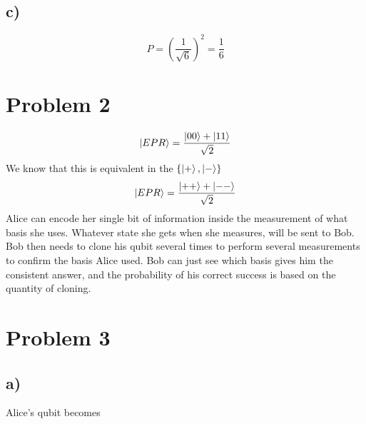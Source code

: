 \documentclass[]{article}
\begin{document}
\hypertarget{c}{%
\subsection{c)}\label{c}}

\[
P = \left( \frac{1}{\sqrt{ 6 }}  \right)^{2}= \frac{1}{6}
\]

\hypertarget{problem-2}{%
\section{Problem 2}\label{problem-2}}

\[
\ket{EPR}  = \frac{{\ket{00} +\ket{11} }}{\sqrt{ 2 }}
\] We know that this is equivalent in the
\(\left\{ \ket{+},\ket{-} \right\}\) \[
\ket{EPR}  = \frac{{\ket{++} +\ket{--} }}{\sqrt{ 2 }}
\] Alice can encode her single bit of information inside the measurement
of what basis she uses. Whatever state she gets when she measures, will
be sent to Bob. Bob then needs to clone his qubit several times to
perform several measurements to confirm the basis Alice used. Bob can
just see which basis gives him the consistent answer, and the
probability of his correct success is based on the quantity of cloning.

\hypertarget{problem-3}{%
\section{Problem 3}\label{problem-3}}

\hypertarget{a-1}{%
\subsection{a)}\label{a-1}}

Alice's qubit becomes
\end{document}
